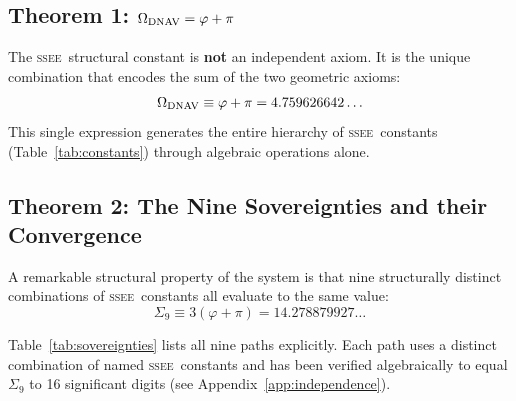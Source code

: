 \documentclass[12pt,a4paper]{article}
\newcommand{\SSEE}{\ifmmode\mathrm{SSEE}\else\textsc{ssee}\fi}
\begin{document}
\subsection{Theorem 1: \texorpdfstring{$\Omega_{\rm DNAV} = \varphi+\pi$}{Omega = phi+pi}}
\label{sec:omega}

The \SSEE\ structural constant is \textbf{not} an independent axiom.
It is the unique combination that encodes the sum of the two geometric axioms:
\begin{equation}
\Omega_{\rm DNAV} \equiv \varphi + \pi = 4.759626642\ldots
\label{eq:omega}
\end{equation}
This single expression generates the entire hierarchy of \SSEE\ constants
(Table~\ref{tab:constants}) through algebraic operations alone.

\subsection{Theorem 2: The Nine Sovereignties and their Convergence}
\label{sec:sovereigns}

A remarkable structural property of the system is that nine structurally distinct
combinations of \SSEE\ constants all evaluate to the same value:
\begin{equation}
\Sigma_9 \equiv 3(\varphi+\pi) = 14.278879927\ldots
\label{eq:sigma9}
\end{equation}

Table~\ref{tab:sovereignties} lists all nine paths explicitly.
Each path uses a distinct combination of named \SSEE\ constants and has been
verified algebraically to equal $\Sigma_9$ to 16 significant digits
(see Appendix~\ref{app:independence}).
\end{document}
